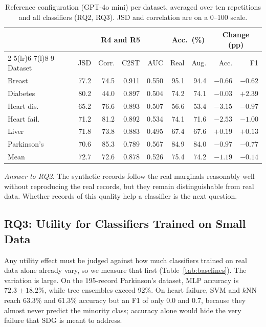 \documentclass[conference]{IEEEtran}
\begin{document}
\begin{table}[t]
\centering
\caption{Reference configuration (GPT-4o mini) per dataset, averaged over ten repetitions and all classifiers (RQ2, RQ3). JSD and correlation are on a 0--100 scale.}
\label{tab:full}
\footnotesize
\setlength{\tabcolsep}{2.2pt}
\begin{tabular*}{\columnwidth}{@{\extracolsep{\fill}}lrrrrrrrr@{}}
\toprule
& \multicolumn{4}{c}{R4 and R5} & \multicolumn{2}{c}{Acc.\ (\%)} & \multicolumn{2}{c}{Change (pp)} \\
\cmidrule(lr){2-5}\cmidrule(lr){6-7}\cmidrule(l){8-9}
Dataset & JSD & Corr. & C2ST & AUC & Real & Aug. & Acc. & F1 \\
\midrule
Breast & 77.2 & 74.5 & 0.911 & 0.550 & 95.1 & 94.4 & $-0.66$ & $-0.62$ \\
Diabetes & 80.2 & 44.0 & 0.897 & 0.504 & 74.2 & 74.1 & $-0.03$ & $+2.39$ \\
Heart dis. & 65.2 & 76.6 & 0.893 & 0.507 & 56.6 & 53.4 & $-3.15$ & $-0.97$ \\
Heart fail. & 71.2 & 81.2 & 0.892 & 0.534 & 74.1 & 71.6 & $-2.53$ & $-1.00$ \\
Liver & 71.8 & 73.8 & 0.883 & 0.495 & 67.4 & 67.6 & $+0.19$ & $+0.13$ \\
Parkinson's & 70.6 & 85.3 & 0.789 & 0.567 & 84.9 & 84.0 & $-0.97$ & $-0.77$ \\
\midrule
Mean & 72.7 & 72.6 & 0.878 & 0.526 & 75.4 & 74.2 & $-1.19$ & $-0.14$ \\
\bottomrule
\end{tabular*}
\end{table}

\noindent\textit{Answer to RQ2.} The synthetic records follow the real marginals reasonably well without reproducing the real records, but they remain distinguishable from real data. Whether records of this quality help a classifier is the next question.

\subsection{RQ3: Utility for Classifiers Trained on Small Data}
\label{sec:rq3}
Any utility effect must be judged against how much classifiers trained on real data alone already vary, so we measure that first (Table~\ref{tab:baselines}). The variation is large. On the 195-record Parkinson's dataset, MLP accuracy is $72.3\pm18.2\%$, while tree ensembles exceed 92\%. On heart failure, SVM and $k$NN reach 63.3\% and 61.3\% accuracy but an F1 of only 0.0 and 0.7, because they almost never predict the minority class; accuracy alone would hide the very failure that SDG is meant to address.
\end{document}
